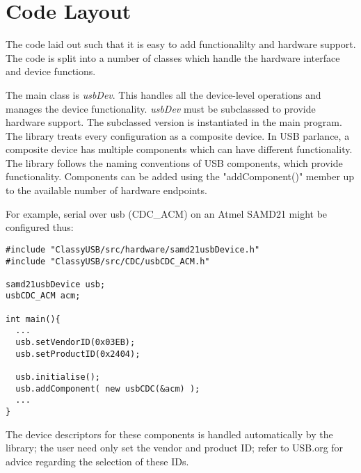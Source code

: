 \chapter{Code Layout}

The code laid out such that it is easy to add functionalilty and hardware support. The code is split into a number of classes which handle the hardware interface and device functions.

The main class is \emph{usbDev}. This handles all the device-level operations and manages the device functionality. \emph{usbDev} must be subclasssed to provide hardware support. The subclassed version is instantiated in the main program. The library treats every configuration as a composite device. In USB parlance, a composite device has multiple components which can have different functionality. The library follows the naming conventions of USB components, which provide functionality. Components can be added using the "addComponent()" member up to the available number of hardware endpoints.

For example, serial over usb (CDC\_ACM) on an Atmel SAMD21 might be configured thus:

\begin{verbatim}
#include "ClassyUSB/src/hardware/samd21usbDevice.h"
#include "ClassyUSB/src/CDC/usbCDC_ACM.h"

samd21usbDevice usb;
usbCDC_ACM acm;

int main(){
  ...
  usb.setVendorID(0x03EB);
  usb.setProductID(0x2404);

  usb.initialise();
  usb.addComponent( new usbCDC(&acm) );
  ...
}
\end{verbatim}

The device descriptors for these components is handled automatically by the library; the user need only set the vendor and product ID; refer to USB.org for advice regarding the selection of these IDs.
